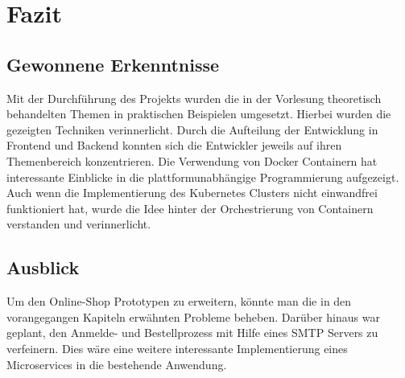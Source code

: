\chapter{Fazit}\label{ch:fazit}
\section{Gewonnene Erkenntnisse}\label{sec:gewonnene-erkenntnisse}
Mit der Durchführung des Projekts wurden die in der Vorlesung theoretisch behandelten Themen in praktischen Beispielen umgesetzt. Hierbei wurden die gezeigten Techniken verinnerlicht. Durch die Aufteilung der Entwicklung in Frontend und Backend konnten sich die Entwickler jeweils auf ihren Themenbereich konzentrieren. Die Verwendung von Docker Containern hat interessante Einblicke in die plattformunabhängige Programmierung aufgezeigt. Auch wenn die Implementierung des Kubernetes Clusters nicht einwandfrei funktioniert hat, wurde die Idee hinter der Orchestrierung von Containern verstanden und verinnerlicht. 

\section{Ausblick}\label{sec:ausblick}
Um den Online-Shop Prototypen zu erweitern, könnte man die in den vorangegangen Kapiteln erwähnten Probleme beheben. Darüber hinaus war geplant, den Anmelde- und Bestellprozess mit Hilfe eines SMTP Servers zu verfeinern. Dies wäre eine weitere interessante Implementierung eines Microservices in die bestehende Anwendung.